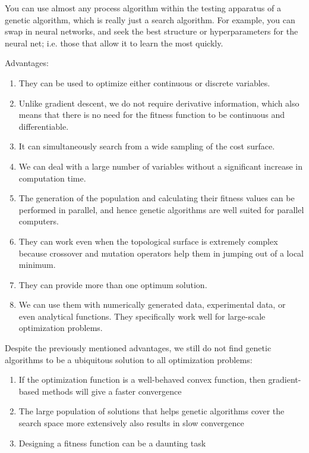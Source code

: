 You can use almost any process algorithm within the testing apparatus of a genetic algorithm, which is really just a search algorithm. For example, you can swap in neural networks, and seek the best structure or hyperparameters for the neural net; i.e. those that allow it to learn the most quickly.


Advantages:
\begin{enumerate}
\item They can be used to optimize either continuous or discrete variables.

\item Unlike gradient descent, we do not require derivative information, which also means that there is no need for the fitness function to be continuous and differentiable.

\item It can simultaneously search from a wide sampling of the cost surface.

\item We can deal with a large number of variables without a significant increase in computation time.

\item The generation of the population and calculating their fitness values can be performed in parallel, and hence genetic algorithms are well suited for parallel computers.

\item They can work even when the topological surface is extremely complex because crossover and mutation operators help them in jumping out of a local minimum.

\item They can provide more than one optimum solution.

\item We can use them with numerically generated data, experimental data, or even analytical functions. They specifically work well for large-scale optimization problems.
\end{enumerate}

Despite the previously mentioned advantages, we still do not find genetic algorithms to be a ubiquitous solution to all optimization problems\cite{Mathur2019}: 
\begin{enumerate}
\item If the optimization function is a well-behaved convex function, then gradient-based methods will give a faster convergence

\item The large population of solutions that helps genetic algorithms cover the search space more extensively also results in slow convergence

\item Designing a fitness function can be a daunting task
\end{enumerate}

